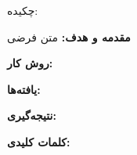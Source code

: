 \begin{center}
  {\Titr\fontsize{18pt}{22pt}\selectfont\TitleFA\par}
\end{center}

\vspace{1.2em}

{\noindent\Titr\fontsize{16pt}{20pt}\selectfont چکیده:}

\vspace{1em}

\noindent\textbf{مقدمه و هدف:}
متن فرضی
\vspace{0.6em}

\noindent\textbf{روش کار:}

\vspace{0.6em}

\noindent\textbf{یافته‌ها:}

\vspace{0.6em}

\noindent\textbf{نتیجه‌گیری:}

\vspace{1em}

\noindent\textbf{کلمات کلیدی:} \KeywordsFA

\clearpage


